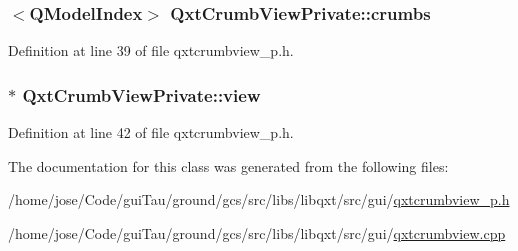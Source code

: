 \hypertarget{class_qxt_crumb_view_private_a5965891608cbf8c274ed31da00945ced}{
\subsubsection[{crumbs}]{$<$Q\-Model\-Index$>$ Qxt\-Crumb\-View\-Private\-::crumbs}}\label{class_qxt_crumb_view_private_a5965891608cbf8c274ed31da00945ced}


Definition at line 39 of file qxtcrumbview\-\_\-p.\-h.

\hypertarget{class_qxt_crumb_view_private_a536b676a37acf181d5a15525785514b8}{
\subsubsection[{view}]{$\ast$ Qxt\-Crumb\-View\-Private\-::view}}\label{class_qxt_crumb_view_private_a536b676a37acf181d5a15525785514b8}


Definition at line 42 of file qxtcrumbview\-\_\-p.\-h.



The documentation for this class was generated from the following files\-:\begin{DoxyCompactItemize}
\item 
/home/jose/\-Code/gui\-Tau/ground/gcs/src/libs/libqxt/src/gui/\hyperlink{qxtcrumbview__p_8h}{qxtcrumbview\-\_\-p.\-h}\item 
/home/jose/\-Code/gui\-Tau/ground/gcs/src/libs/libqxt/src/gui/\hyperlink{qxtcrumbview_8cpp}{qxtcrumbview.\-cpp}\end{DoxyCompactItemize}
